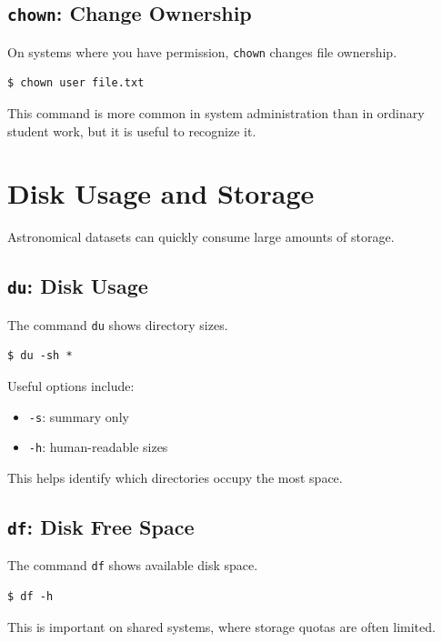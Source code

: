 \subsection{\texttt{chown}: Change Ownership}

On systems where you have permission, \texttt{chown} changes file ownership.

\begin{lstlisting}
$ chown user file.txt
\end{lstlisting}

This command is more common in system administration than in ordinary
student work, but it is useful to recognize it.

\section{Disk Usage and Storage}

Astronomical datasets can quickly consume large amounts of storage.

\subsection{\texttt{du}: Disk Usage}

The command \texttt{du} shows directory sizes.

\begin{lstlisting}
$ du -sh *
\end{lstlisting}

Useful options include:

\begin{itemize}
\item \texttt{-s}: summary only
\item \texttt{-h}: human-readable sizes
\end{itemize}

This helps identify which directories occupy the most space.

\subsection{\texttt{df}: Disk Free Space}

The command \texttt{df} shows available disk space.

\begin{lstlisting}
$ df -h
\end{lstlisting}

This is important on shared systems, where storage quotas are often limited.

